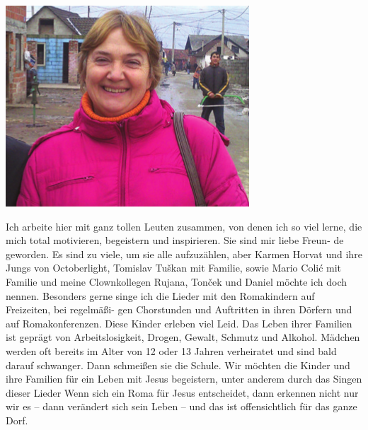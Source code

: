 \documentclass[a4paper,twoside, svgnames]{article}
\begin{document}
\begin{multicols}{2}
\begin{onehalfspacing}
\begin{justify}
\begin{center}
\includegraphics[width=\linewidth]{images/karmen}
\end{center}
Ich arbeite hier mit ganz tollen Leuten zusammen, von denen ich so viel lerne,
die mich total motivieren, begeistern und inspirieren. Sie sind mir liebe Freun-
de geworden. Es sind zu viele, um sie alle aufzuzählen, aber Karmen Horvat
und ihre Jungs von Octoberlight, Tomislav Tuškan mit Familie, sowie Mario
Colić mit Familie und
meine Clownkollegen
Rujana, Tonček und
Daniel möchte ich
doch nennen.
Besonders gerne singe
ich die Lieder mit den
Romakindern auf Freizeiten, bei regelmäßi-
gen Chorstunden und Auftritten in ihren
Dörfern und auf Romakonferenzen. Diese
Kinder erleben viel Leid. Das Leben ihrer
Familien ist geprägt von Arbeitslosigkeit,
Drogen, Gewalt, Schmutz und Alkohol.
Mädchen werden oft bereits im Alter von
12 oder 13 Jahren verheiratet und sind bald
darauf schwanger. Dann schmeißen sie die
Schule. Wir möchten die Kinder und ihre
Familien für ein Leben mit Jesus begeistern,
unter anderem durch das Singen dieser Lieder
Wenn sich ein Roma für Jesus entscheidet,
dann erkennen nicht nur wir es – dann verändert sich sein Leben – und das ist offensichtlich für das
ganze Dorf.\\
\textit{}


\end{justify}
\end{onehalfspacing}
\end{multicols}
\end{document}
